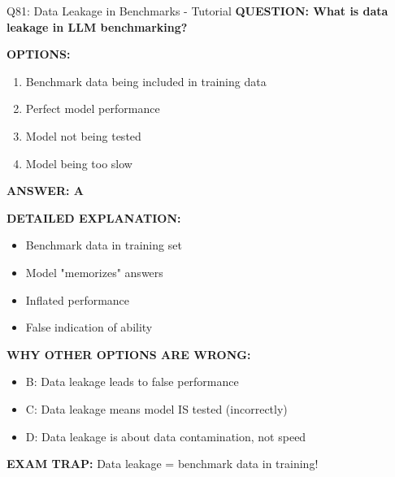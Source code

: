 \documentclass[8pt]{beamer}
\begin{document}
	\begin{frame}{Q81: Data Leakage in Benchmarks - Tutorial}
		\fontsize{6.5}{7.5}\selectfont
		\textbf{QUESTION: What is data leakage in LLM benchmarking?}
		
		\vspace{0.1cm}
		\textbf{OPTIONS:}
		\begin{enumerate}
			\item Benchmark data being included in training data
			\item Perfect model performance
			\item Model not being tested
			\item Model being too slow
		\end{enumerate}
		
		\vspace{0.1cm}
		\textcolor{myblue}{\textbf{ANSWER: A}}
		
		\vspace{0.1cm}
		\textbf{DETAILED EXPLANATION:}
		\begin{itemize}
			\item Benchmark data in training set
			\item Model "memorizes" answers
			\item Inflated performance
			\item False indication of ability
		\end{itemize}
		
		\vspace{0.1cm}
		\textcolor{myred}{\textbf{WHY OTHER OPTIONS ARE WRONG:}}
		\begin{itemize}
			\item \textcolor{myred}{B:} Data leakage leads to false performance
			\item \textcolor{myred}{C:} Data leakage means model IS tested (incorrectly)
			\item \textcolor{myred}{D:} Data leakage is about data contamination, not speed
		\end{itemize}
		
		\textcolor{myred}{\textbf{EXAM TRAP:}} Data leakage = \textcolor{myblue}{benchmark data in training}!
	\end{frame}
	
\end{document}
